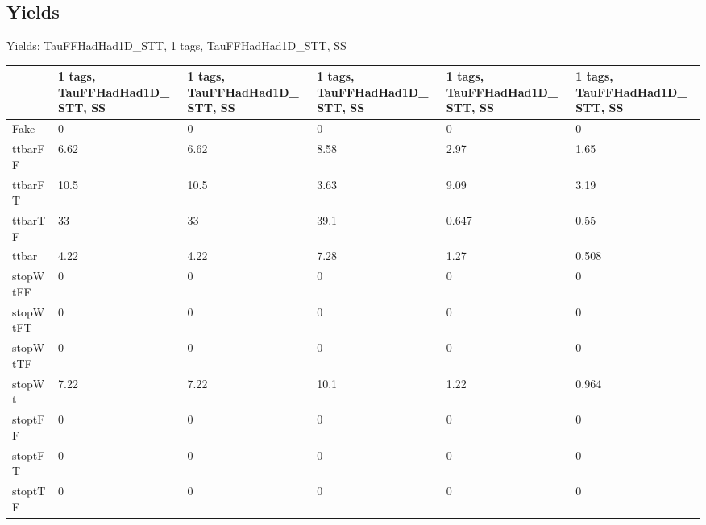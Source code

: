 
\subsection{Yields}

\begin{frame}{Yields: TauFFHadHad1D\_STT, 1 tags, TauFFHadHad1D\_STT, SS}
\begin{center}
  \begin{tabular}{l| >{\centering\let\newline\\\arraybackslash\hspace{0pt}}m{1.4cm}| >{\centering\let\newline\\\arraybackslash\hspace{0pt}}m{1.4cm}| >{\centering\let\newline\\\arraybackslash\hspace{0pt}}m{1.4cm}| >{\centering\let\newline\\\arraybackslash\hspace{0pt}}m{1.4cm}| >{\centering\let\newline\\\arraybackslash\hspace{0pt}}m{1.4cm}}
    & 1 tags, TauFFHadHad1D\_STT, SS & 1 tags, TauFFHadHad1D\_STT, SS & 1 tags, TauFFHadHad1D\_STT, SS & 1 tags, TauFFHadHad1D\_STT, SS & 1 tags, TauFFHadHad1D\_STT, SS \\
 \hline \hline
    Fake& 0 & 0 & 0 & 0 & 0 \\
 \hline
    ttbarFF& 6.62 & 6.62 & 8.58 & 2.97 & 1.65 \\
 \hline
    ttbarFT& 10.5 & 10.5 & 3.63 & 9.09 & 3.19 \\
 \hline
    ttbarTF& 33 & 33 & 39.1 & 0.647 & 0.55 \\
 \hline
    ttbar& 4.22 & 4.22 & 7.28 & 1.27 & 0.508 \\
 \hline
    stopWtFF& 0 & 0 & 0 & 0 & 0 \\
 \hline
    stopWtFT& 0 & 0 & 0 & 0 & 0 \\
 \hline
    stopWtTF& 0 & 0 & 0 & 0 & 0 \\
 \hline
    stopWt& 7.22 & 7.22 & 10.1 & 1.22 & 0.964 \\
 \hline
    stoptFF& 0 & 0 & 0 & 0 & 0 \\
 \hline
    stoptFT& 0 & 0 & 0 & 0 & 0 \\
 \hline
    stoptTF& 0 & 0 & 0 & 0 & 0 \\

\end{tabular}
\end{center}
\end{frame}
